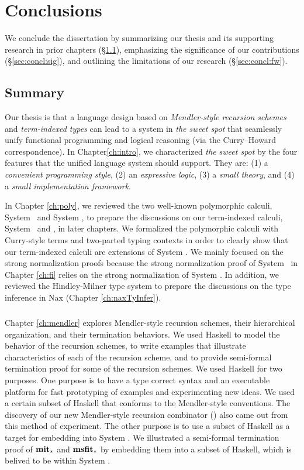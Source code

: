 \chapter{Conclusions}\label{ch:concl}
We conclude the dissertation by summarizing our thesis and
its supporting research in prior chapters (\S\ref{sec:concl:summary}),
emphasizing the significance of our contributions (\S\ref{sec:concl:sig}), and
outlining the limitations of our research (\S\ref{sec:concl:fw}).

\section{Summary}\label{sec:concl:summary}
Our thesis is that a language design based on
\emph{Mendler-style recursion schemes} and \emph{term-indexed types}
can lead to a system in \emph{the sweet spot} that seamlessly unify
functional programming and logical reasoning
(via the Curry--Howard correspondence).
In Chapter\ref{ch:intro}, we characterized \emph{the sweet spot} by
the four features that the unified language system should support.
They are: (1) a \emph{convenient programming style},
(2) an \emph{expressive logic}, (3) a \emph{small theory}, and
(4) a \emph{small implementation framework}.

In Chapter \ref{ch:poly}, we reviewed the two well-known polymorphic calculi,
System \F\ and System \Fw, to prepare the discussions on
our term-indexed calculi, System \Fi\ and \Fixi, in later chapters.
We formalized the polymorphic calculi with Curry-style terms and
two-parted typing contexts in order to clearly show that
our term-indexed calculi are extensions of System \Fw.
We mainly focused on the strong normalization proofs
because the strong normalization proof of System \Fi\ in Chapter \ref{ch:fi}
relies on the strong normalization of System \Fw.
In addition, we reviewed the Hindley-Milner type system to prepare
the discussions on the type inference in Nax (Chapter \ref{ch:naxTyInfer}).

\paragraph{}
Chapter \ref{ch:mendler} explores Mendler-style recursion schemes,
their hierarchical organization, and their termination behaviors.
We used Haskell to model the behavior of the recursion schemes, to write
examples that illustrate characteristics of each of the recursion scheme,
and to provide semi-formal termination proof for some of the recursion
schemes. We used Haskell for two purposes.
One purpose is to have a type correct syntax and an executable platform for
fast prototyping of examples and experimenting new ideas. We used a certain
subset of Haskell that conforms to the Mendler-style conventions.
The discovery of our new Mendler-style recursion combinator (\MsfIt)
also came out from this method of experiment.
The other purpose is to use a subset of Haskell as a target for embedding
into System \Fw. We illustrated a semi-formal termination proof of
$\mathbf{mit}_{*}$ and $\mathbf{msfit}_{*}$ by embedding them into a subset of Haskell,
which is belived to be within System \Fw.

